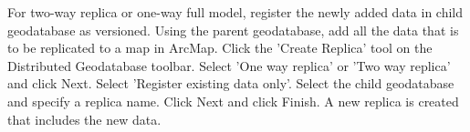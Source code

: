 \documentclass[class=article , crop=false, titlepage, twoside, multi={itemize, figure, verbatim}, float=false]{standalone}
\begin{document}
For two-way replica or one-way full model, register the newly added data in child geodatabase as versioned.
Using the parent geodatabase, add all the data that is to be replicated to a map in ArcMap.
Click the 'Create Replica' tool on the Distributed Geodatabase toolbar.
Select 'One way replica' or 'Two way replica' and click Next.
Select 'Register existing data only'.
Select the child geodatabase and specify a replica name.
Click Next and click Finish.
A new replica is created that includes the new data.
\end{document}

